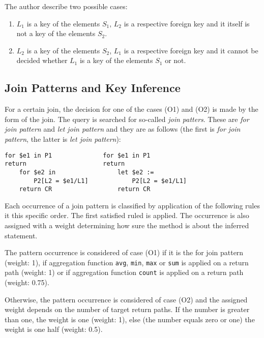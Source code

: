 The author describe two possible cases:

\begin{enumerate}
\renewcommand{\theenumi}{(O\arabic{enumi})}
\renewcommand{\labelenumi}{\theenumi}
\item $L_1$ is a key of the elements $S_1$, $L_2$ is a respective foreign key and it itself is not a key of the elements $S_2$.
\item $L_2$ is a key of the elements $S_2$, $L_1$ is a respective foreign key and it cannot be decided whether $L_1$ is a key of the elements $S_1$ or not.
\end{enumerate}

\subsection{Join Patterns and Key Inference}
For a certain join, the decision for one of the cases (O1) and (O2) is made by the form of the join. The query is searched for so-called \emph{join patters}. These are \emph{for join pattern} and \emph{let join pattern} and they are as follows (the first is \emph{for join pattern}, the latter is \emph{let join pattern}):

\begin{verbatim}
for $e1 in P1              for $e1 in P1
return                     return
    for $e2 in                 let $e2 :=
        P2[L2 = $e1/L1]            P2[L2 = $e1/L1]
    return CR                  return CR
\end{verbatim}

Each occurrence of a join pattern is classified by application of the following rules it this specific order. The first satisfied ruled is applied. The occurrence is also assigned with a weight determining how sure the method is about the inferred statement.

The pattern occurrence is considered of case (O1) if it is the for join pattern (weight: 1), if aggregation function \texttt{avg}, \texttt{min}, \texttt{max} or \texttt{sum} is applied on a return path (weight: 1) or if aggregation function \texttt{count} is applied on a return path (weight: 0.75). 

Otherwise, the pattern occurrence is considered of case (O2) and the assigned weight depends on the number of target return paths. If the number is greater than one, the weight is one (weight: 1), else (the number equals zero or one) the weight is one half (weight: 0.5).

